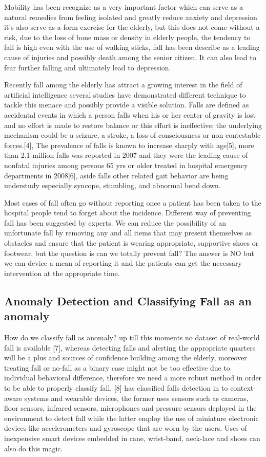 \documentclass[a4paper, parskip=full]{scrartcl}
\begin{document}
Mobility has been recognize as a very important factor which can serve as a natural remedies from feeling isolated and greatly reduce anxiety and depression it’s also serve as a form exercise for the elderly, but this does not come without a risk, due to the loss of bone mass or density in elderly people, the tendency to fall is high even with the use of walking sticks, fall has been describe as a leading cause of injuries and possibly death among the senior citizen. It can also lead to fear further falling and ultimately lead to depression.

Recently fall among the elderly has attract a growing interest in the field of artificial intelligence several studies have demonstrated different technique to tackle this menace and possibly provide a visible solution. Falls are defined as accidental events in which a person falls when his or her center of gravity is lost and no effort is made to restore balance or this effort is ineffective; the underlying mechanism could be a seizure, a stroke, a loss of consciousness or non contestable forces.[4], The prevalence of falls is known to increase sharply with age[5], more than 2.1 million falls was reported in 2007 and they were the leading cause of nonfatal injuries among persons 65 yrs or older treated in hospital emergency departments in 2008[6], aside falls other related gait behavior are being understudy especially syncope, stumbling, and abnormal bend down. 

Most cases of fall often go without reporting once a patient has been taken to the hospital people tend to forget about the incidence. Different way of preventing fall has been suggested by experts. We can reduce the possibility of an unfortunate fall by removing any and all items that may present themselves as obstacles and ensure that the patient is wearing appropriate, supportive shoes or footwear, but the question is can we totally prevent fall? The answer is NO but we can device a mean of reporting it and the patients can get the necessary intervention at the appropriate time.

\subsection*{Anomaly Detection and Classifying Fall as an anomaly}

How do we classify fall as anomaly? up till this moments no dataset of real-world fall is available [7], whereas detecting falls and alerting the appropriate quarters will be a plus and sources of confidence building among the elderly, moreover treating fall or no-fall as a binary case might not be too effective due to individual behavioral difference, therefore we need a more robust method in order to be able to properly classify fall. [8]  has classified falls detection in to context-aware systems and wearable devices, the former uses sensors such as cameras, floor sensors, infrared sensors, microphones and pressure sensors deployed in the environment to detect fall while the latter employ the use of miniature electronic devices like accelerometers and gyroscope that are worn by the users. Uses of inexpensive smart devices embedded in cane, wrist-band, neck-lace and shoes can also do this magic.
\end{document}
